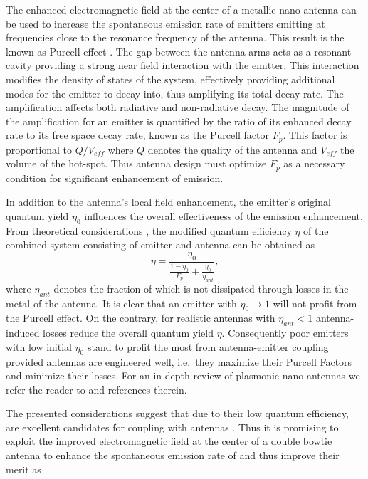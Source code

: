 		The enhanced electromagnetic field at the center of a metallic nano-antenna can be used to increase the spontaneous emission rate of emitters emitting at frequencies close to the resonance frequency of the antenna. This result is the known as Purcell effect \cite{purcell1995spontaneous}. The gap between the antenna arms acts as a resonant cavity providing a strong near field interaction with the emitter. This interaction modifies the density of states of the system, effectively providing additional modes for the emitter to decay into, thus amplifying its total decay rate. The amplification affects both radiative and non-radiative decay.
		The magnitude of the amplification for an emitter is quantified by the ratio of its enhanced decay rate to its free space decay rate, known as the Purcell factor $F_p$. This factor is proportional to $Q/V_{eff}$ where $Q$ denotes the quality of the antenna and $V_{eff}$ the volume of the hot-spot. Thus antenna design must optimize $F_p$ as a necessary condition for significant enhancement of \fl emission.
		
		In addition to the antenna's local field enhancement, the emitter's original quantum yield $\eta_0$ influences the overall effectiveness of the emission enhancement. From theoretical considerations \cite{rahbany2016towards, mohammadi2008gold, mohammadi2010fluorescence, wientjes2014nanoantenna}, the modified quantum efficiency $\eta$ of the combined system consisting of emitter and antenna can be obtained as
		\begin{equation}
			\eta = \frac{\eta_0}{\frac{1-\eta_0}{F_p} + \frac{\eta_0}{\eta_{ant}} },
		\end{equation}
		where $\eta_{ant}$ denotes the fraction of \fl which is not dissipated through losses in the metal of the antenna. It is clear that an emitter with $\eta_0 \to 1$ will not profit from the Purcell effect. On the contrary, for realistic antennas with $\eta_{ant} < 1$ antenna-induced losses reduce the overall quantum yield $\eta$. Consequently poor emitters with low initial $\eta_{0}$ stand to profit the most from antenna-emitter coupling provided antennas are engineered well, i.e.\ they maximize their Purcell Factors and minimize their losses. For an in-depth review of plasmonic nano-antennas we refer the reader to \cite{rahbany2016towards} and references therein.
		
		The presented considerations suggest that due to their low quantum efficiency, \sivs are excellent candidates for coupling with antennas \cite{Neu2012a}. Thus it is promising to exploit the improved electromagnetic field at the center of a double bowtie antenna to enhance the spontaneous emission rate of \sivs and thus improve their merit as \spss.

